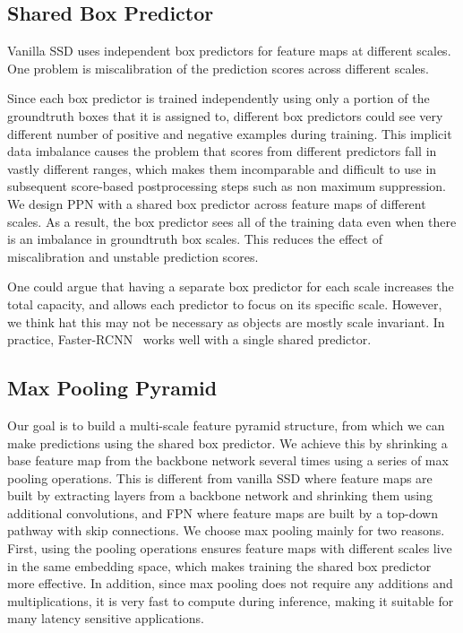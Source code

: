 \documentclass[10pt,twocolumn,letterpaper]{article}
\begin{document}
\subsection{Shared Box Predictor}
Vanilla SSD uses independent box predictors for feature maps at different scales.
One problem is miscalibration of the prediction scores across different scales.

Since each box predictor is trained independently using only
a portion of the groundtruth boxes that it is assigned to,
different box predictors could see very different number of
positive and negative examples during training.  This
implicit data imbalance causes the problem that scores
from different predictors fall in vastly different ranges,
which makes them incomparable and difficult to use in
subsequent score-based postprocessing steps such as non maximum
suppression.  We design PPN with a shared box predictor
across feature maps of different scales.  As a result, the
box predictor sees all of the training data even when
there is an imbalance in groundtruth box scales. This reduces
the effect of miscalibration and unstable prediction scores.

One could argue that having a separate box predictor for each
scale increases the total capacity, and allows each
predictor to focus on its specific scale. However, we think
hat this may not be necessary as objects are mostly scale
invariant. In practice, Faster-RCNN~\cite{ren2015frcnn}
works well with a single shared predictor.


\subsection{Max Pooling Pyramid}

Our goal is to build a multi-scale feature pyramid
structure, from which we can make predictions using the
shared box predictor.  We achieve this by shrinking a
base feature map from the backbone network several times
using a series of max pooling operations.  This is different
from vanilla SSD where feature maps are built by extracting layers
from a backbone network and shrinking them using additional
convolutions, and FPN where feature maps are built by a
top-down pathway with skip connections.  We choose max
pooling mainly for two reasons.  First, using the pooling
operations ensures feature maps with different scales live
in the same embedding space, which makes training the shared
box predictor more effective.  In addition, since max
pooling does not require any additions and multiplications,
it is very fast to compute during inference,
making it suitable for many latency sensitive applications.
\end{document}
